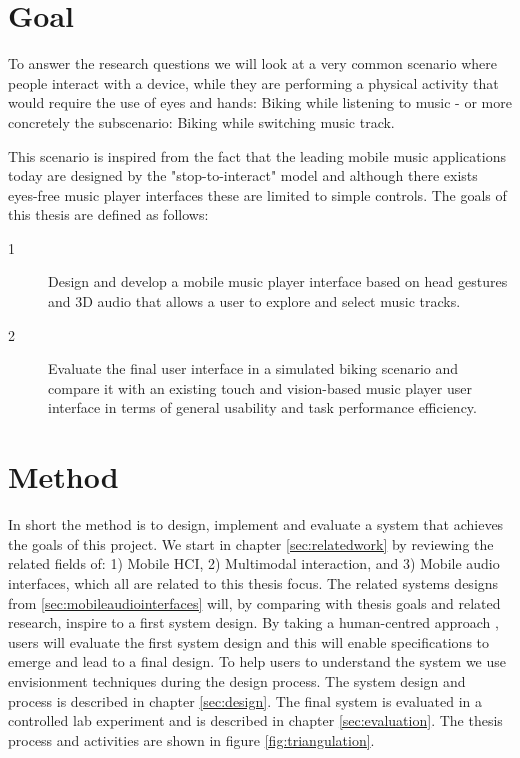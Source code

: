 \section{Goal}
\label{sec:goal}
To answer the research questions we will look at a very common scenario where people interact with a device, while they are performing a physical activity that would require the use of eyes and hands: Biking while listening to music - or more concretely the subscenario: Biking while switching music track.

This scenario is inspired from the fact that the leading mobile music applications today are designed by the "stop-to-interact" model and although there exists eyes-free music player interfaces these are limited to simple controls. The goals of this thesis are defined as follows:

\begin{description}
\item[1] Design and develop a mobile music player interface based on head gestures and 3D audio that allows a user to explore and select music tracks.
\item[2] Evaluate the final user interface in a simulated biking scenario and compare it with an existing touch and vision-based music player user interface in terms of general usability and task performance efficiency.
\end{description}


\section{Method}
\label{sec:introductionmethod}
In short the method is to design, implement and evaluate a system that achieves the goals of this project. We start in chapter \ref{sec:relatedwork} by reviewing the related fields of: 1) Mobile HCI, 2) Multimodal interaction, and 3) Mobile audio interfaces, which all are related to this thesis focus. The related systems designs from \ref{sec:mobileaudiointerfaces} will, by comparing with thesis goals and related research, inspire to a first system design. By taking a human-centred approach \cite{benyon_designing_2010}, users will evaluate the first system design and this will enable specifications to emerge and lead to a final design. To help users to understand the system we use envisionment techniques \cite{benyon_designing_2010} during the design process. The system design and process is described in chapter \ref{sec:design}. The final system is evaluated in a controlled lab experiment and is described in chapter \ref{sec:evaluation}. The thesis process and activities are shown in figure \ref{fig:triangulation}.

